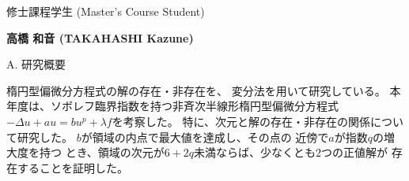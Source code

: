 \documentclass[a4j,twocolumn]{jarticle}
\begin{document}


修士課程学生 (Master's Course Student)



{\bf 高橋 和音 (TAKAHASHI Kazune)}

%
%
%
%


\vspace{0.2cm}
\noindent
A. 研究概要

\vspace{0.1cm}


楕円型偏微分方程式の解の存在・非存在を、
変分法を用いて研究している。
本年度は、ソボレフ臨界指数を持つ非斉次半線形楕円型偏微分方程式
$-\Delta u + a u = b u^p + \lambda f$を考察した。
特に、次元と解の存在・非存在の関係について研究した。
$b$が領域の内点で最大値を達成し、その点の
近傍で$a$が指数$q$の増大度を持つ
とき、領域の次元が$6 + 2q$未満ならば、少なくとも$2$つの正値解が
存在することを証明した。
\end{document}
